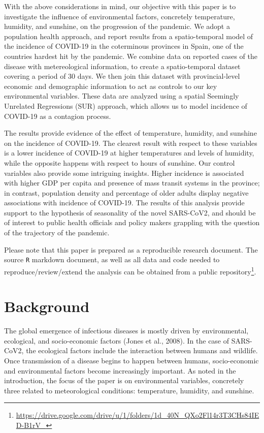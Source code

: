 \documentclass[]{elsarticle} %
\begin{document}
With the above considerations in mind, our objective with this paper is
to investigate the influence of environmental factors, concretely
temperature, humidity, and sunshine, on the progression of the pandemic.
We adopt a population health approach, and report results from a
spatio-temporal model of the incidence of COVID-19 in the coterminous
provinces in Spain, one of the countries hardest hit by the pandemic. We
combine data on reported cases of the disease with metereological
information, to create a spatio-temporal dataset covering a period of 30
days. We then join this dataset with provincial-level economic and
demographic information to act as controls to our key environmental
variables. These data are analyzed using a spatial Seemingly Unrelated
Regressions (SUR) approach, which allows us to model incidence of
COVID-19 as a contagion process.

The results provide evidence of the effect of temperature, humidity, and
sunshine on the incidence of COVID-19. The clearest result with respect
to these variables is a lower incidence of COVID-19 at higher
temperatures and levels of humidity, while the opposite happens with
respect to hours of sunshine. Our control variables also provide some
intriguing insights. Higher incidence is associated with higher GDP per
capita and presence of mass transit systems in the province; in
contrast, population density and percentage of older adults display
negative associations with incidence of COVID-19. The results of this
analysis provide support to the hypothesis of seasonality of the novel
SARS-CoV2, and should be of interest to public health officials and
policy makers grappling with the question of the trajectory of the
pandemic.

Please note that this paper is prepared as a reproducible research
document. The source \texttt{R} markdown document, as well as all data
and code needed to reproduce/review/extend the analysis can be obtained
from a public
repository\footnote{\url{https://drive.google.com/drive/u/1/folders/1d_40N_QXo2Fl14r3T3CHs84IED-B1rV_}}.

\hypertarget{background}{%
\section{Background}\label{background}}

The global emergence of infectious diseases is mostly driven by
environmental, ecological, and socio-economic factors (Jones et al.,
2008). In the case of SARS-CoV2, the ecological factors include the
interaction between humans and wildlife. Once transmission of a disease
begins to happen between humans, socio-economic and environmental
factors become increasingly important. As noted in the introduction, the
focus of the paper is on environmental variables, concretely three
related to meteorological conditions: temperature, humidity, and
sunshine.
\end{document}
